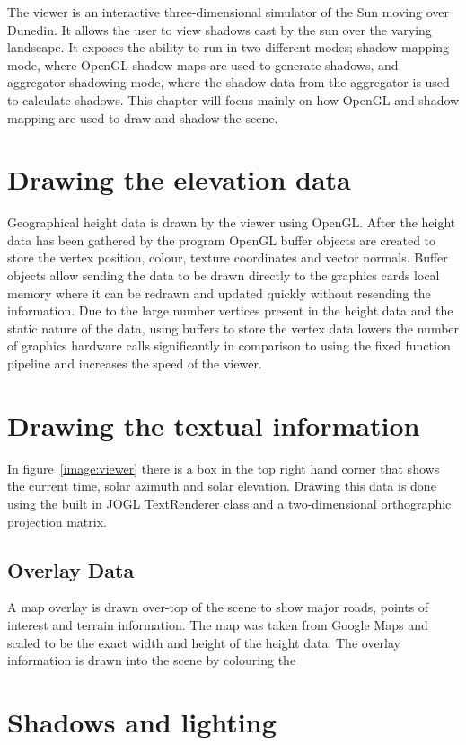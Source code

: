 \documentclass[12pt]{report}
\begin{document}
The viewer is an interactive three-dimensional simulator of the Sun moving over Dunedin. It allows the user to view shadows cast by the sun over the varying landscape. It exposes the ability to run in two different modes; shadow-mapping mode, where OpenGL shadow maps are used to generate shadows, and aggregator shadowing mode, where the shadow data from the aggregator is used to calculate shadows. This chapter will focus mainly on how OpenGL and shadow mapping are used to draw and shadow the scene.\\

\section{Drawing the elevation data}
Geographical height data is drawn by the viewer using OpenGL. After the height data has been gathered by the program OpenGL buffer objects are created to store the vertex position, colour, texture coordinates and vector normals. Buffer objects allow sending the data to be drawn directly to the graphics cards local memory where it can be redrawn and updated quickly without resending the information. Due to the large number vertices present in the height data and the static nature of the data, using buffers to store the vertex data lowers the number of graphics hardware calls significantly in comparison to using the fixed function pipeline and increases the speed of the viewer.\\

\section{Drawing the textual information}
In figure~\ref{image:viewer} there is a box in the top right hand corner that shows the current time, solar azimuth and solar elevation. Drawing this data is done using the built in JOGL TextRenderer class and a two-dimensional orthographic projection matrix.

\subsection{Overlay Data}
A map overlay is drawn over-top of the scene to show major roads, points of interest and terrain information. The map was taken from Google Maps\cite{gmaps} and scaled to be the exact width and height of the height data. The overlay information is drawn into the scene by colouring the 

\section{Shadows and lighting}
\end{document}
